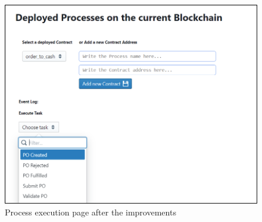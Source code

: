 \begin{figure}[hbt]
	\includegraphics[width=\textwidth]{gfx/persistence_after}
	\caption{Process execution page after the improvements}
	\label{fig:impr:persistence:after}
\end{figure}


